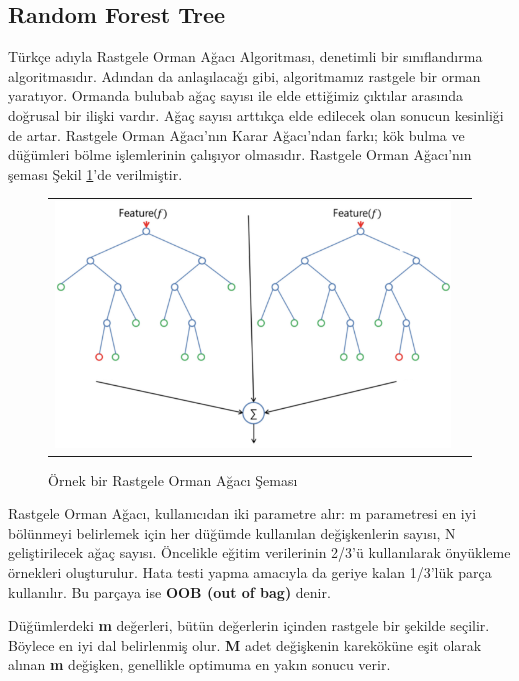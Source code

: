 \documentclass[conference]{IEEEtran}
\begin{document}
\subsection{\textbf{Random Forest Tree}}
\quad Türkçe adıyla Rastgele Orman Ağacı Algoritması, denetimli bir sınıflandırma algoritmasıdır. Adından da anlaşılacağı gibi, algoritmamız rastgele bir orman yaratıyor. Ormanda bulubab ağaç sayısı ile elde ettiğimiz çıktılar arasında doğrusal bir ilişki vardır. Ağaç sayısı arttıkça elde edilecek olan sonucun kesinliği de artar. Rastgele Orman Ağacı’nın Karar Ağacı’ndan farkı; kök bulma ve düğümleri bölme işlemlerinin çalışıyor olmasıdır\cite{19}. Rastgele Orman Ağacı’nın şeması Şekil \ref{fig:07}'de verilmiştir.

\begin{figure}[!h]
	\centering%
	\begin{center}
		\begin{tabular}{cc}%
			\includegraphics[scale=0.45]{pictures/pic_07.png}&%
		\end{tabular}%
	\end{center}
	\caption{Örnek bir Rastgele Orman Ağacı Şeması\cite{20}}%
	\label{fig:07}
\end{figure}

\quad Rastgele Orman Ağacı, kullanıcıdan iki parametre alır: m parametresi en iyi bölünmeyi belirlemek için her düğümde kullanılan değişkenlerin sayısı, N geliştirilecek ağaç sayısı. Öncelikle eğitim verilerinin 2/3'ü kullanılarak önyükleme örnekleri oluşturulur. Hata testi yapma amacıyla da geriye kalan 1/3'lük parça kullanılır. Bu parçaya ise \textbf{OOB (out of bag)} denir\cite{21}.

\quad Düğümlerdeki \textbf{m} değerleri, bütün değerlerin içinden rastgele bir şekilde seçilir. Böylece en iyi dal belirlenmiş olur. \textbf{M} adet değişkenin kareköküne eşit olarak alınan \textbf{m} değişken, genellikle optimuma en yakın sonucu verir\cite{21}.
\end{document}

